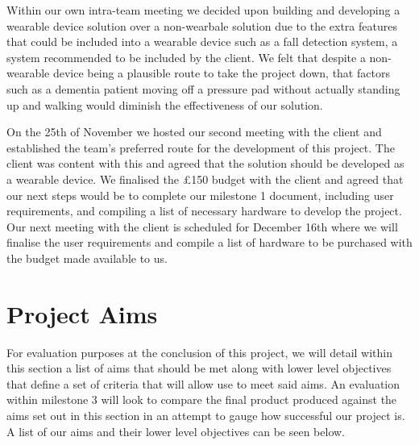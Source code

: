         Within our own intra-team meeting we decided upon building and developing a wearable device solution over a
        non-wearbale solution due to the extra features that could be included into a wearable device such as a fall
        detection system, a system recommended to be included by the client. We felt that despite a non-wearable device
        being a plausible route to take the project down, that factors such as a dementia patient moving off a pressure
        pad without actually standing up and walking would diminish the effectiveness of our solution.

        On the 25th of November we hosted our second meeting with the client and established the team's preferred route
        for the development of this project. The client was content with this and agreed that the solution should be
        developed as a wearable device. We finalised the £150 budget with the client and agreed that our next steps
        would be to complete our milestone 1 document, including user requirements, and compiling a list of necessary
        hardware to develop the project. Our next meeting with the client is scheduled for December 16th where we will
        finalise the user requirements and compile a list of hardware to be purchased with the budget made available to
        us.

    \section{Project Aims}
        For evaluation purposes at the conclusion of this project, we will detail within this section a list of aims that should be met along with lower level objectives that define a set of criteria that will allow use to meet said aims. An evaluation within milestone 3 will look to compare the final product produced against the aims set out in this section in an attempt to gauge how successful our project is. A list of our aims and their lower level objectives can be seen below.

